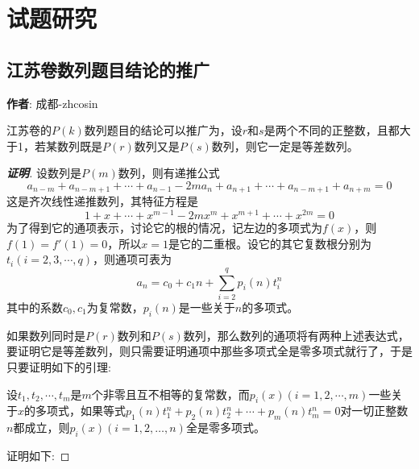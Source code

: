 
\section{试题研究}
\label{sec:problem-study}

\subsection{江苏卷数列题目结论的推广}
\label{sec:jiangshu-series-extend}

\textbf{作者}: 成都-zhcosin

江苏卷的$P(k)$数列题目的结论可以推广为，设$r$和$s$是两个不同的正整数，且都大于1，若某数列既是$P(r)$数列又是$P(s)$数列，则它一定是等差数列。

\begin{proof}[\textbf{证明}]
  设数列是$P(m)$数列，则有递推公式
  \[ a_{n-m}+a_{n-m+1}+\cdots+a_{n-1}-2ma_n+a_{n+1}+\cdots+a_{n-m+1}+a_{n+m}=0 \]
  这是齐次线性递推数列，其特征方程是
  \[ 1+x+\cdots+x^{m-1}-2mx^m+x^{m+1}+\cdots+x^{2m}=0 \]
  为了得到它的通项表示，讨论它的根的情况，记左边的多项式为$f(x)$，则$f(1)=f'(1)=0$，所以$x=1$是它的二重根。设它的其它复数根分别为$t_i(i=2,3,\cdots,q)$，则通项可表为
  \[ a_n=c_0+c_1 n + \sum_{i=2}^q p_i(n)t_i^n \]
  其中的系数$c_0,c_1$为复常数，$p_i(n)$是一些关于$n$的多项式。

  如果数列同时是$P(r)$数列和$P(s)$数列，那么数列的通项将有两种上述表达式，要证明它是等差数列，则只需要证明通项中那些多项式全是零多项式就行了，于是只要证明如下的引理:
  \begin{lemma}
    设$t_1,t_2,\cdots,t_m$是$m$个非零且互不相等的复常数，而$p_i(x)(i=1,2,\cdots,m)$一些关于$x$的多项式，如果等式$p_1(n)t_1^n+p_2(n)t_2^n+\cdots+p_m(n)t_m^n=0$对一切正整数$n$都成立，则$p_i(x)(i=1,2,\ldots,n)$全是零多项式。
  \end{lemma}
  证明如下:


\end{proof}
